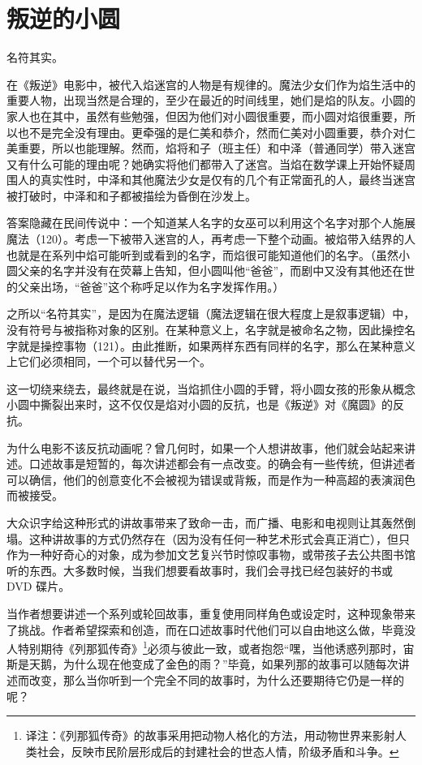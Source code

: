 \chapter{叛逆的小圆}
名符其实。

在《叛逆》电影中，被代入焰迷宫的人物是有规律的。魔法少女们作为焰生活中的重要人物，出现当然是合理的，至少在最近的时间线里，她们是焰的队友。小圆的家人也在其中，虽然有些勉强，但因为他们对小圆很重要，而小圆对焰很重要，所以也不是完全没有理由。更牵强的是仁美和恭介，然而仁美对小圆重要，恭介对仁美重要，所以也能理解。然而，焰将和子（班主任）和中泽（普通同学）带入迷宫又有什么可能的理由呢？她确实将他们都带入了迷宫。当焰在数学课上开始怀疑周围人的真实性时，中泽和其他魔法少女是仅有的几个有正常面孔的人，最终当迷宫被打破时，中泽和和子都被描绘为昏倒在沙发上。

答案隐藏在民间传说中：一个知道某人名字的女巫可以利用这个名字对那个人施展魔法（120）。考虑一下被带入迷宫的人，再考虑一下整个动画。被焰带入结界的人也就是在系列中焰可能听到或看到的名字，而焰很可能知道他们的名字。（虽然小圆父亲的名字并没有在荧幕上告知，但小圆叫他“爸爸”，而剧中又没有其他还在世的父亲出场，“爸爸”这个称呼足以作为名字发挥作用。）

之所以“名符其实”，是因为在魔法逻辑（魔法逻辑在很大程度上是叙事逻辑）中，没有符号与被指称对象的区别。在某种意义上，名字就是被命名之物，因此操控名字就是操控事物（121）。由此推断，如果两样东西有同样的名字，那么在某种意义上它们必须相同，一个可以替代另一个。

这一切绕来绕去，最终就是在说，当焰抓住小圆的手臂，将小圆女孩的形象从概念小圆中撕裂出来时，这不仅仅是焰对小圆的反抗，也是《叛逆》对《魔圆》的反抗。

为什么电影不该反抗动画呢？曾几何时，如果一个人想讲故事，他们就会站起来讲述。口述故事是短暂的，每次讲述都会有一点改变。的确会有一些传统，但讲述者可以确信，他们的创意变化不会被视为错误或背叛，而是作为一种高超的表演润色而被接受。

大众识字给这种形式的讲故事带来了致命一击，而广播、电影和电视则让其轰然倒塌。这种讲故事的方式仍然存在（因为没有任何一种艺术形式会真正消亡），但只作为一种好奇心的对象，成为参加文艺复兴节时惊叹事物，或带孩子去公共图书馆听的东西。大多数时候，当我们想要看故事时，我们会寻找已经包装好的书或 DVD 碟片。

当作者想要讲述一个系列或轮回故事，重复使用同样角色或设定时，这种现象带来了挑战。作者希望探索和创造，而在口述故事时代他们可以自由地这么做，毕竟没人特别期待《列那狐传奇》\footnote{译注：《列那狐传奇》的故事采用把动物人格化的方法，用动物世界来影射人类社会，反映市民阶层形成后的封建社会的世态人情，阶级矛盾和斗争。}必须与彼此一致，或者抱怨“嘿，当他诱惑列那时，宙斯是天鹅，为什么现在他变成了金色的雨？”毕竟，如果列那的故事可以随每次讲述而改变，那么当你听到一个完全不同的故事时，为什么还要期待它仍是一样的呢？

